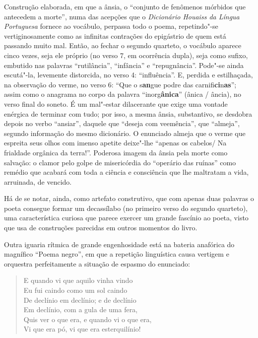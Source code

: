 Construção elaborada, em que a ânsia, o “conjunto de fenômenos
mórbidos que antecedem a morte”, numa das acepções que o
\textit{Dicionário Houaiss da Língua Portuguesa} fornece ao vocábulo,
perpassa todo o poema, repetindo"-se vertiginosamente como as infinitas
contrações do epigástrio de quem está passando muito mal. Então, ao
fechar o segundo quarteto, o vocábulo aparece cinco vezes, seja ele
próprio (no verso 7, em ocorrência dupla), seja como sufixo, embutido
nas palavras “rutilância”, “infância” e “repugnância”. Pode"-se ainda
escutá"-la, levemente distorcida, no verso 4: “influência”. E, perdida e
estilhaçada, na observação do verme, no verso 6: “Que o s\textbf{an}gue
podre das carnifi\textbf{ci}n\textbf{as}”; assim como o anagrama no
corpo da palavra “inorg\textbf{ânica}” (ânica / ância), no verso final
do soneto. É um mal"-estar dilacerante que exige uma vontade enérgica de
terminar com tudo; por isso, a mesma ânsia, substantivo, se desdobra
depois no verbo “ansiar”, daquele que “deseja com veemência”, que
“almeja”, segundo informação do mesmo dicionário. O enunciado almeja
que o verme que espreita seus olhos com imenso apetite deixe"-lhe
“apenas os cabelos/ Na frialdade orgânica da terra!”. Poderosa imagem
da ânsia pela morte como salvação: o clamor pelo golpe de misericórdia
do “operário das ruínas” como remédio que acabará com toda a ciência e
consciência que lhe maltratam a vida, arruinada, de vencido.

Há de se notar, ainda, como artefato construtivo, que com apenas
duas palavras o poeta consegue formar um decassílabo (no primeiro verso
do segundo quarteto), uma característica curiosa que parece exercer um
grande fascínio ao poeta, visto que usa de construções parecidas em
outros momentos do livro.

Outra iguaria rítmica de grande engenhosidade está na bateria
anafórica do magnífico “Poema negro”, em que a repetição linguística
causa vertigem e orquestra perfeitamente a situação de espasmo do
enunciado:

\begin{verse}
E quando vi que aquilo vinha vindo\\
Eu fui caindo como um sol caindo\\
De declínio em declínio; e de declínio \\
Em declínio, com a gula de uma fera,\\
Quis ver o que era, e quando vi o que era,\\
Vi que era pó, vi que era esterquilínio!
\end{verse}

